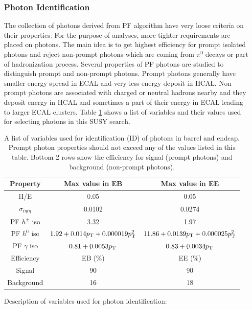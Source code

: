 \subsubsection{Photon Identification}
\label{sec:photonID}
The collection of photons derived from PF algorithm have very loose criteria on their properties. For the purpose of analyses, more tighter requirements are placed on photons. The main idea is to get highest efficiency for prompt isolated photons and reject non-prompt photons which are coming from $\pi^0$ decays or part of hadronization process. Several properties of PF photons are studied to distinguish prompt and non-prompt photons. Prompt photons generally have smaller energy spread in ECAL and very less energy deposit in HCAL. Non-prompt photons are associated with charged or neutral hadrons nearby and they deposit energy in HCAL and sometimes a part of their energy in ECAL leading to larger ECAL clusters. Table \ref{tab:photonID} shows a list of variables and their values used for selecting photons in this SUSY search.
\begin{table}[h!]
\centering
\captionsetup{width=.99\linewidth}
\caption[Photon Identification ]{A list of variables used for identification (ID) of photons in barrel and endcap. Prompt photon properties should not exceed any of the values listed in this table. Bottom 2 rows show the efficiency for signal (prompt photons) and background (non-prompt photons).}
\label{tab:photonID}
\begin{tabular}{c|c|c}
\hline
Property		&	Max value in EB		&	Max value in EE\\\hline\hline
H/E					&	0.05				&	0.05\\
$\sigma_{i\eta i\eta}$&	0.0102				&	0.0274\\
PF $h^\pm$ iso	&	3.32		&	1.97\\
PF $h^0$ iso	&	$1.92 + 0.014p_{\mathrm{T}} + 0.000019p_{\mathrm{T}}^2$	&	$11.86 + 0.0139p_{\mathrm{T}}+0.000025p_{\mathrm{T}}^2$\\
PF $\gamma$ iso	&	$0.81 + 0.0053p_{\mathrm{T}}$	&	$0.83 + 0.0034p_{\mathrm{T}}$\\\hline\hline
Efficiency		&	EB (\%)			&	EE (\%) \\\hline
Signal			&	90					&	90 \\
Background		&	16					&	18\\\hline
\end{tabular}
\end{table}
Description of variables used for photon identification:
